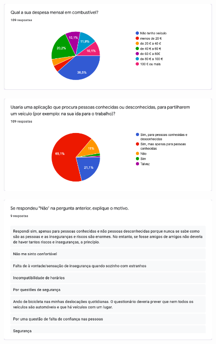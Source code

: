 \begin{figure}[H]
    \centering
	\includegraphics[scale=0.65]{imagens/i3.png}
	\label{img:pag}
\end{figure}

\begin{figure}[H]
    \centering
	\includegraphics[scale=0.65]{imagens/i4.png}
	\label{img:pag}
\end{figure}

\begin{figure}[H]
    \centering
	\includegraphics[scale=0.65]{imagens/i5.png}
	\label{img:pag}
\end{figure}

